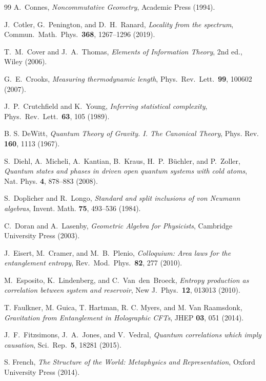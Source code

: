 \documentclass[12pt,a4paper,openany]{book}
\begin{document}
\begin{thebibliography}{99}
A.~Connes, \emph{Noncommutative Geometry}, Academic Press (1994).

J.~Cotler, G.~Penington, and D.~H.~Ranard,
\emph{Locality from the spectrum},
Commun.\ Math.\ Phys.\ \textbf{368}, 1267--1296 (2019).

T.~M.~Cover and J.~A.~Thomas,
\emph{Elements of Information Theory},
2nd ed., Wiley (2006).

G.~E.~Crooks,
\emph{Measuring thermodynamic length},
Phys.\ Rev.\ Lett.\ \textbf{99}, 100602 (2007).

J.~P.~Crutchfield and K.~Young,
\emph{Inferring statistical complexity},
Phys.\ Rev.\ Lett.\ \textbf{63}, 105 (1989).

B. S. DeWitt, \emph{Quantum Theory of Gravity. I. The Canonical Theory}, Phys. Rev. \textbf{160}, 1113 (1967).

S.~Diehl, A.~Micheli, A.~Kantian, B.~Kraus, H.~P.~B\"uchler, and P.~Zoller, \emph{Quantum states and phases in driven open quantum systems with cold atoms}, Nat. Phys. \textbf{4}, 878--883 (2008).

S.~Doplicher and R.~Longo, \emph{Standard and split inclusions of von Neumann algebras}, Invent. Math. \textbf{75}, 493--536 (1984).

C.~Doran and A.~Lasenby, \emph{Geometric Algebra for Physicists}, Cambridge University Press (2003).

J.~Eisert, M.~Cramer, and M.~B.~Plenio,
\emph{Colloquium: Area laws for the entanglement entropy},
Rev.\ Mod.\ Phys.\ \textbf{82}, 277 (2010).

M.~Esposito, K.~Lindenberg, and C.~Van~den~Broeck,
\emph{Entropy production as correlation between system and reservoir},
New J.\ Phys.\ \textbf{12}, 013013 (2010).

T. Faulkner, M. Guica, T. Hartman, R. C. Myers, and M. Van Raamsdonk, \emph{Gravitation from Entanglement in Holographic CFTs}, JHEP \textbf{03}, 051 (2014).

J.~F.~Fitzsimons, J.~A.~Jones, and V.~Vedral,
\emph{Quantum correlations which imply causation},
Sci.\ Rep.\ \textbf{5}, 18281 (2015).

S. French, \emph{The Structure of the World: Metaphysics and Representation}, Oxford University Press (2014).


\end{thebibliography}
\end{document}

